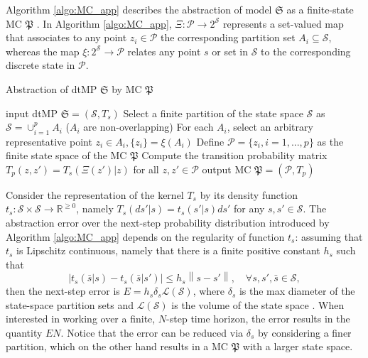 \documentclass{llncs}
\begin{document}
Algorithm \ref{algo:MC_app} describes the abstraction of model $\mathfrak S$ as a finite-state MC $\mathfrak P$ \cite{APKL10}.  
In Algorithm \ref{algo:MC_app}, 
$\Xi: \mathcal P \rightarrow 2^{\mathcal S}$ represents a set-valued map that associates to any point $z_{i}\in \mathcal P$ the corresponding partition set $A_{i} \subseteq \mathcal S$, 
whereas the map $\xi: 2^\mathcal S \rightarrow \mathcal P$ relates any point $s$ or set in $\mathcal S$ to 
the corresponding discrete state in $\mathcal P$.
\vspace{-0.2in}
\begin{algorithm}[h]
\caption{Abstraction of dtMP $\mathfrak S$ by  MC $\mathfrak P$}
\label{algo:MC_app}
\begin{center}
\begin{algorithmic}[1]
\REQUIRE 
input dtMP $\mathfrak S = (\mathcal S,T_s)$
\STATE
Select a finite
partition of the state space $\mathcal S$ as $\mathcal S = \cup_{i=1}^{p} A_i$  
($A_{i}$ are non-overlapping)
\STATE
For each $A_{i}$, select an arbitrary representative point $z_{i} \in A_{i}, \{z_i\} = \xi (A_i)$ 
\STATE
Define 
$\mathcal P = \{z_i, i=1,...,p\}$ as the finite state space of the MC $\mathfrak P$
\STATE
Compute the transition probability matrix
$T_p (z, z') = T_{s} (\Xi(z')\vert z)$
for all $z,z'\in \mathcal P$
\ENSURE
output MC $\mathfrak P = (\mathcal P, T_p)$
\vspace{-0.1in}
\end{algorithmic}
\end{center}
\end{algorithm}

Consider the representation of the kernel $T_s$ by its density function $t_s:\mathcal S\times\mathcal S\rightarrow \mathbb R^{\ge 0}$, 
namely $T_s(ds'|s) = t_s(s'|s)d s'$ for any $s,s'\in\mathcal S$.
The abstraction error over the next-step probability distribution introduced by Algorithm \ref{algo:MC_app} depends on the regularity of function $t_s$: 
assuming that $t_s$ is Lipschitz continuous, namely that there is a finite positive constant $h_s$ such that
\begin{equation}
\label{eq:glob_lip}
\left|t_{s}(\bar{s}\vert s)-t_{s}(\bar{s}\vert s')\right|\leq h_s\left\|s-s'\right\|, \quad\forall s,s',\bar s \in \mathcal S,
\end{equation}
then the next-step error is $E = h_s\delta_s\mathscr L(\mathcal S)$, 
where $\delta_s$ is the max diameter of the state-space partition sets and $\mathscr L(\mathcal S)$ is the volume of the state space \cite{APKL10}. 
When interested in working over a finite, $N$-step time horizon, the error results in the quantity $E N$. 
Notice that the error can be reduced via $\delta_s$ by considering a finer partition, 
which on the other hand results in a MC $\mathfrak P$ with a larger state space. 
\end{document}

